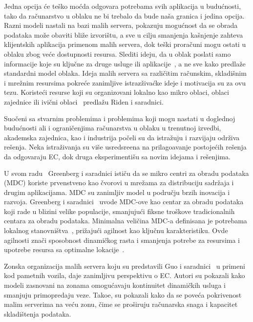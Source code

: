 Jedna opcija \'ce te\v sko mo\'cda odgovara potrebama svih aplikacija u budu\'cnosti, tako da ra\v cunarstvo u oblaku ne bi trebalo da bude naša granica i jedina opcija. Razni modeli nastali na bazi malih servera, pokazuju mogu\'cnost da se obrada podataka mo\v ze obaviti bli\v ze izvori\v stu, a sve u cilju smanjenja ka\v snjenje zahteva klijentskih aplikacija primenom malih servera, dok teški proračuni mogu ostati u oblaku zbog ve\'ce dostupnosti resursa. Slediti ideju, da u oblak poslati samo informacije koje su klju\v cne za druge usluge ili aplikacije~\cite{inproceedingsSimic1}, a ne sve kako predla\v ze standardni model oblaka. Ideja malih servera sa razli\v citim ra\v cunskim, skladi\v snim i mre\v znim resursima pokre\'ce zanimljive istraz\v ziva\'cke ideje i motivacija  su za ovu tezu. Koriste\'ci resurse koji su organizovani lokalno kao mikro oblaci, oblaci zajednice ili ivi\v cni oblaci~\cite {RydenOCW14} predla\v zu Riden i saradnici.

Suo\v ceni sa stvarnim problemima i problemima koji mogu nastati u doglednoj budu\'cnosti ali i ograni\v cenjima ra\v cunarstva u oblaku u trenutnoj izvedbi, akademska zajednica, kao i industrija po\v celi su da istra\v zuju i razvijaju odr\v ziva re\v senja. Neka istra\v zivanja su vi\v se usredsre\dj ena na prilago\dj avanje postoje\'cih re\v senja da odgovaraju EC, dok druga eksperimenti\v su sa novim idejama i re\v senjima.

U svom radu~\cite{GreenbergHMP09} Greenberg i saradnici ističu da se mikro centri za obradu podataka (MDC) koriste prvenstveno kao \v cvorovi u mre\v zama za distribuciju sadr\v zaja i drugim  aplikacijama. MDC su zanimljiv model u podru\v cju brzih inovacija i razvoja. Greenberg i saradnici~\cite{GreenbergHMP09} uvode MDC-ove kao centar za obradu podataka koji rade u blizini velike populacije, smanjuju\'ci fiksne tro\v skove tradicionalnih centara za obradu podataka. Minimalna veli\v cina MDC-a definisana je potrebama lokalnog stanovništva~\cite{GreenbergHMP09, AbbasZTS18}, pri\v zaju\'ci agilnost kao klju\v cnu karakteristiku. Ovde agilnosti zna\v ci sposobnost dinami\v ckog rasta i smanjenja potrebe za resursima i upotrebe resursa sa optimalne lokacije~\cite{GreenbergHMP09}. 

Zonska organizacija malih servera koju su predstavili Guo i saradnici~\cite{GuoRG20} u primeni kod pametnih vozila, daje zanimljivu perspektivu o EC. Autori su pokazali kako modeli zasnovani na zonama omogućavaju kontinuitet dinami\v ckih usluga i smanjuju primopredaju veze. Tako\dj e, su pokazali kako da se pove\'ca pokrivenost malim serverima na ve\'cu zonu, \v cime se pro\v siruju ra\v cunarska snaga i kapacitet skladištenja podataka.

